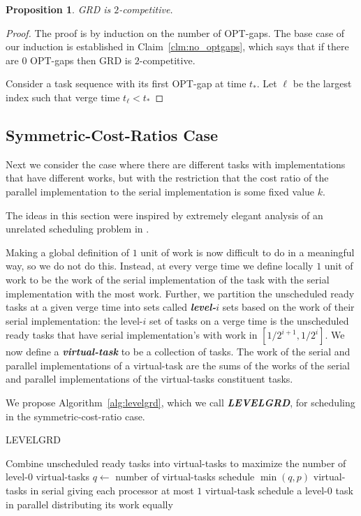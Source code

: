 \documentclass[twocolumn]{article}[10pt]
\newcommand{\defn}[1]{{\textit{\textbf{\boldmath #1}}}\xspace}
\newtheorem{proposition}{Proposition}
\begin{document}
\begin{proposition}
  \label{prop:2competitive}
  GRD is $2$-competitive.
\end{proposition}
\begin{proof}
  The proof is by induction on the number of OPT-gaps. 
  The base case of our induction is established in
  Claim~\ref{clm:no_optgaps}, which says that if there are $0$
  OPT-gaps then GRD is $2$-competitive. 

  Consider a task sequence with its first OPT-gap at time $t_*$.
  Let $\ell$ be the largest index such that verge time $t_\ell <
  t_*$
\end{proof}


\subsection{Symmetric-Cost-Ratios Case}
\label{subsec:symmetriccostratio}
Next we consider the case where there are different tasks with
implementations that have different works, but with the
restriction that the cost ratio of the parallel implementation to
the serial implementation is some fixed value $k$.

The ideas in this section were inspired by extremely elegant
analysis of an unrelated scheduling problem in \cite{bamboo20}.

Making a global definition of $1$ unit of work is now difficult
to do in a meaningful way, so we do not do this. Instead, at
every verge time we define locally $1$ unit of work to be the
work of the serial implementation of the task with the serial
implementation with the most work. 
Further, we partition the unscheduled ready tasks at a given verge time into
sets called \defn{level-$i$} sets based on the work of their serial
implementation: the level-$i$ set of tasks on a verge time is the
unscheduled ready tasks that have serial implementation's with
work in $[1/2^{i+1}, 1/2^{i}]$.
We now define a \defn{virtual-task} to be a collection of tasks.
The work of the serial and parallel implementations of a
virtual-task are the sums of the works of the serial and parallel
implementations of the virtual-tasks constituent tasks.

We propose Algorithm~\ref{alg:levelgrd}, which we call \defn{LEVELGRD},
for scheduling in the symmetric-cost-ratio case.

\begin{algorithm}
  \caption{LEVELGRD}
  \label{alg:levelgrd}
  \begin{algorithmic}
        \State Combine unscheduled ready tasks into virtual-tasks
        to maximize the number of level-$0$ virtual-tasks
        \State $q \gets $ number of virtual-tasks 
          \State schedule $\min(q, p)$ virtual-tasks in serial
          \State giving each processor at most $1$ virtual-task
        \Else
          \State schedule a level-$0$ task in parallel
          \State distributing its work equally 
        \EndIf
      \EndIf
    \EndWhile
  \end{algorithmic}
\end{algorithm}
\end{document}
